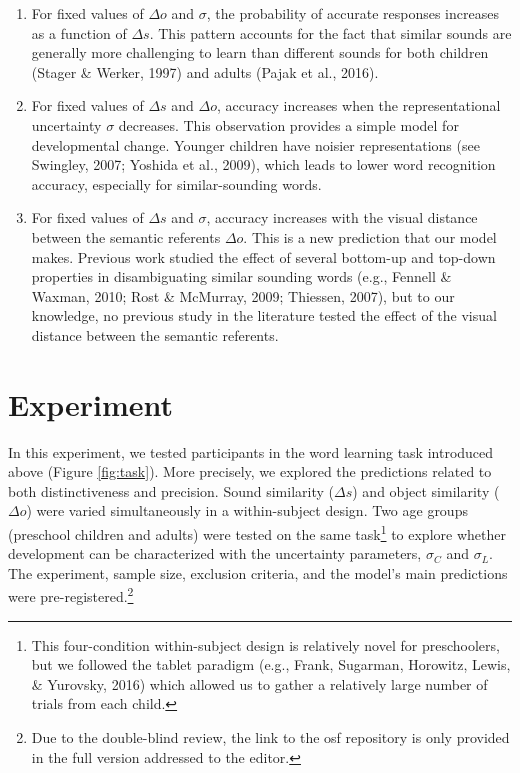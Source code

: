 \documentclass[english,,man]{apa6}
\let\rmarkdownfootnote\footnote%
\def\footnote{\protect\rmarkdownfootnote}
\begin{document}
\begin{enumerate}
\def\labelenumi{\arabic{enumi})}
\item
  For fixed values of \(\Delta o\) and \(\sigma\), the probability of accurate responses increases as a function of \(\Delta s\). This pattern accounts for the fact that similar sounds are generally more challenging to learn than different sounds for both children (Stager \& Werker, 1997) and adults (Pajak et al., 2016).
\item
  For fixed values of \(\Delta s\) and \(\Delta o\), accuracy increases when the representational uncertainty \(\sigma\) decreases. This observation provides a simple model for developmental change. Younger children have noisier representations (see Swingley, 2007; Yoshida et al., 2009), which leads to lower word recognition accuracy, especially for similar-sounding words.
\item
  For fixed values of \(\Delta s\) and \(\sigma\), accuracy increases with the visual distance between the semantic referents \(\Delta o\). This is a new prediction that our model makes. Previous work studied the effect of several bottom-up and top-down properties in disambiguating similar sounding words (e.g., Fennell \& Waxman, 2010; Rost \& McMurray, 2009; Thiessen, 2007), but to our knowledge, no previous study in the literature tested the effect of the visual distance between the semantic referents.
\end{enumerate}

\hypertarget{experiment}{%
\section{Experiment}\label{experiment}}

In this experiment, we tested participants in the word learning task introduced above (Figure \ref{fig:task}). More precisely, we explored the predictions related to both distinctiveness and precision. Sound similarity (\(\Delta s\)) and object similarity (\(\Delta o\)) were varied simultaneously in a within-subject design. Two age groups (preschool children and adults) were tested on the same task\footnote{This four-condition within-subject design is relatively novel for preschoolers, but we followed the tablet paradigm (e.g., Frank, Sugarman, Horowitz, Lewis, \& Yurovsky, 2016) which allowed us to gather a relatively large number of trials from each child.} to explore whether development can be characterized with the uncertainty parameters, \(\sigma_C\) and \(\sigma_L\). The experiment, sample size, exclusion criteria, and the model's main predictions were pre-registered.\footnote{Due to the double-blind review, the link to the osf repository is only provided in the full version addressed to the editor.}
\end{document}
